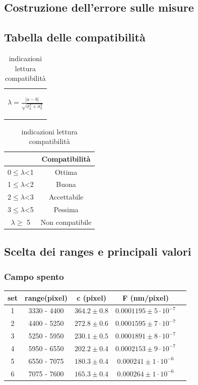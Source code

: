 \documentclass{article}
\begin{document}
	\subsection{Costruzione dell'errore sulle misure}
	\label{Calcerr}

	\subsection{Tabella delle compatibilità}
	\medskip
	\begin{table}[H]
		\centering
		\begin{tabular}{c}
			\begin{Large}
			$\lambda=\frac{|a-b|}{\sqrt{\sigma_a^2+\sigma_b^2}}$
			\end{Large}\\
		\end{tabular}
		\hspace{0.5cm}
		\begin{tabular}{cc}
			\toprule
			&       \textbf{Compatibilità   }       \\
			\midrule
			0$\leq \lambda$<1   &Ottima                 \\
			1$\leq \lambda$<2   &Buona                  \\
			2$\leq \lambda$<3   &Accettabile            \\
			3$\leq\lambda$<5   &Pessima                \\
			$ \lambda \geq $  5     &Non compatibile        \\
			\bottomrule
		\end{tabular}
		\caption{indicazioni lettura compatibilità}
		\label{tab:compatibilità}
	\end{table}
	
	
\subsection{Scelta dei ranges e principali valori }
\subsubsection{Campo spento}
\begin{center}
\begin{tabular} {ccccc}
\toprule
set	& range(pixel)& c (pixel) & F (nm/pixel)\\
\midrule
1	&	3330	-	4400	&$	364.2	\pm 0.8$& $0.0001195 \pm 5\cdot 10^{-7} $	\\
2	& 	4400	-	5250	&$	272.8 \pm 0.6$&$ 0.0001595 \pm 7\cdot 10^{-7}$ \\
3	&	5250	-	5950	&$	230.1 \pm 0.5$&$0.0001891 \pm8\cdot10^{-7}$\\
4	&	5950	-	6550	&$	202.2 \pm 0.4	$&$0.0002153 \pm 9\cdot10^{-7}$\\
5	&	6550	-	7075	&$	180.3	\pm 0.4$& $0.000241 \pm 1\cdot10^{-6} $\\
6	&	7075	-	7600	&$	165.3 \pm 0.4$& $0.000264\pm1\cdot10^{-6}$\\
\bottomrule
\end{tabular}
\end{center}
\end{document}
